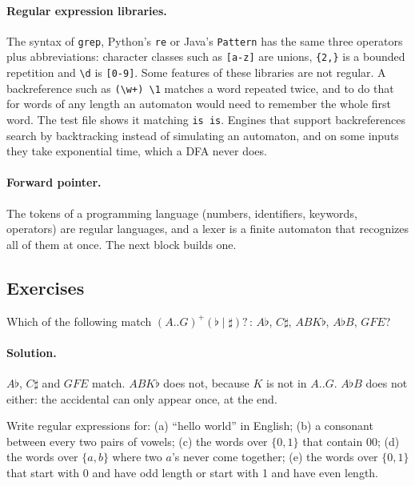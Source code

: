 \paragraph{Regular expression libraries.} The syntax of \texttt{grep}, Python's
\texttt{re} or Java's \texttt{Pattern} has the same three operators plus
abbreviations: character classes such as \texttt{[a-z]} are unions,
\texttt{\{2,\}} is a bounded repetition and \texttt{\textbackslash{}d} is
\texttt{[0-9]}.
Some features of these libraries are not regular. A backreference such as
\texttt{(\textbackslash{}w+) \textbackslash{}1} matches a word repeated twice,
and to do that for words of any length an automaton would need to remember
the whole first word. The test file shows it matching \texttt{is is}. Engines
that support backreferences search by backtracking instead of simulating an
automaton, and on some inputs they take exponential time, which a DFA never
does.

\paragraph{Forward pointer.} The tokens of a programming language (numbers,
identifiers, keywords, operators) are regular languages, and a lexer is a
finite automaton that recognizes all of them at once. The next block builds
one.

\subsection{Exercises}

\begin{exercise}
Which of the following match $(A..G)^+(\flat \mid \sharp)?$\,:
$A\flat$, $C\sharp$, $ABK\flat$, $A\flat B$, $GFE$?
\end{exercise}

\paragraph{Solution.} $A\flat$, $C\sharp$ and $GFE$ match. $ABK\flat$ does not,
because $K$ is not in $A..G$. $A\flat B$ does not either: the accidental can
only appear once, at the end.

\begin{exercise}
Write regular expressions for: (a) ``hello world'' in English; (b) a consonant
between every two pairs of vowels; (c) the words over $\{0,1\}$ that contain
$00$; (d) the words over $\{a,b\}$ where two $a$'s never come together;
(e) the words over $\{0,1\}$ that start with 0 and have odd length or start
with 1 and have even length.
\end{exercise}

